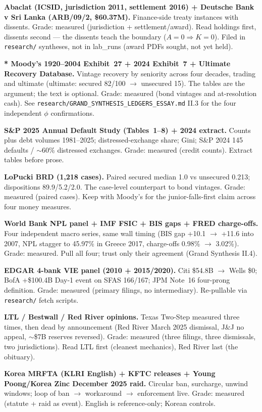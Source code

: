 \textbf{Abaclat (ICSID, jurisdiction 2011, settlement 2016) + Deutsche Bank v Sri Lanka (ARB/09/2, \$60.37M).} Finance-side treaty instances with dissents. Grade: measured (jurisdiction + settlement/award). Read holdings first, dissents second --- the dissents teach the boundary ($A=0 \Rightarrow K=0$). Filed in \texttt{research/} syntheses, not in lab\_runs (award PDFs sought, not yet held).

\textbf{* Moody's 1920--2004 Exhibit~27 + 2024 Exhibit~7 + Ultimate Recovery Database.} Vintage recovery by seniority across four decades, trading and ultimate (ultimate: secured 82/100 $\to$ unsecured 15). The tables are the argument; the text is optional. Grade: measured (bond vintages and at-resolution cash). See \texttt{research/GRAND\_SYNTHESIS\_LEDGERS\_ESSAY.md} II.3 for the four independent $\phi$ confirmations.

\textbf{S\&P 2025 Annual Default Study (Tables~1--8) + 2024 extract.} Counts plus debt volumes 1981--2025; distressed-exchange share; Gini; S\&P 2024 145 defaults / $\sim$60\% distressed exchanges. Grade: measured (credit counts). Extract tables before prose.

\textbf{LoPucki BRD (1,218 cases).} Paired secured median 1.0 vs unsecured 0.213; dispositions 89.9/5.2/2.0. The case-level counterpart to bond vintages. Grade: measured (paired cases). Keep with Moody's for the junior-falls-first claim across four money measures.

\textbf{World Bank NPL panel + IMF FSIC + BIS gaps + FRED charge-offs.} Four independent macro series, same wall timing (BIS gap +10.1 $\to$ +11.6 into 2007, NPL stagger to 45.97\% in Greece 2017, charge-offs 0.98\% $\to$ 3.02\%). Grade: measured. Pull all four; trust only their agreement (Grand Synthesis II.4).

\textbf{EDGAR 4-bank VIE panel (2010 + 2015/2020).} Citi \$54.8B $\to$ Wells \$0; BofA +\$100.4B Day-1 event on SFAS 166/167; JPM Note~16 four-prong definition. Grade: measured (primary filings, no intermediary). Re-pullable via \texttt{research/} fetch scripts.

\textbf{LTL / Bestwall / Red River opinions.} Texas Two-Step measured three times, then dead by announcement (Red River March 2025 dismissal, J\&J no appeal, $\sim$\$7B reserves reversed). Grade: measured (three filings, three dismissals, two jurisdictions). Read LTL first (cleanest mechanics), Red River last (the obituary).

\textbf{Korea MRFTA (KLRI English) + KFTC releases + Young Poong/Korea Zinc December 2025 raid.} Circular ban, surcharge, unwind windows; loop of ban $\to$ workaround $\to$ enforcement live. Grade: measured (statute + raid as event). English is reference-only; Korean controls.

